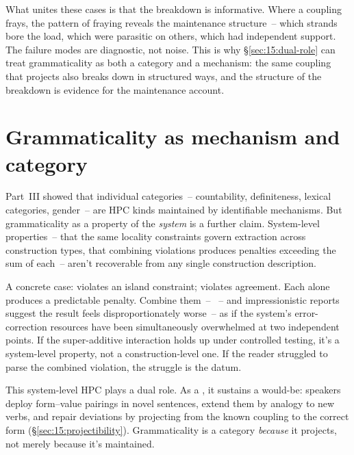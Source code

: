 What unites these cases is that the breakdown is informative. Where a coupling frays, the pattern of fraying reveals the maintenance structure~-- which strands bore the load, which were parasitic on others, which had independent support. The failure modes are diagnostic, not noise. This is why §\ref{sec:15:dual-role} can treat grammaticality as both a category and a mechanism: the same coupling that projects also breaks down in structured ways, and the structure of the breakdown is evidence for the maintenance account.


\section{Grammaticality as mechanism and category}
\label{sec:15:dual-role}

Part~III showed that individual categories~-- countability, definiteness, lexical categories, gender~-- are HPC kinds maintained by identifiable mechanisms. But grammaticality as a property of the \emph{system} is a further claim. System-level properties~-- that the same locality constraints govern extraction across construction types, that combining violations produces penalties exceeding the sum of each~-- aren't recoverable from any single construction description.

A concrete case: \marg{} violates an island constraint; \ungram{} violates agreement. Each alone produces a predictable penalty. Combine them~-- \ungram{}~-- and impressionistic reports suggest the result feels disproportionately worse~-- as if the system's error-correction resources have been simultaneously overwhelmed at two independent points. If the super-additive interaction holds up under controlled testing, it's a system-level property, not a construction-level one. If the reader struggled to parse the combined violation, the struggle is the datum.

This system-level HPC plays a dual role. As a , it sustains a would-be: speakers deploy form--value pairings in novel sentences, extend them by analogy to new verbs, and repair deviations by projecting from the known coupling to the correct form (§\ref{sec:15:projectibility}). Grammaticality is a category \emph{because} it projects, not merely because it's maintained.

